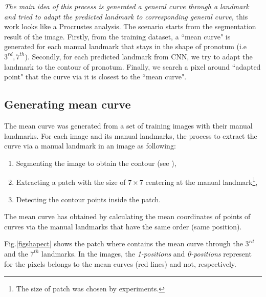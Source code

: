 \documentclass[10pt]{article}
\begin{document}
\textit{The main idea of this process is generated a general curve through a landmark and tried to adapt the predicted landmark to corresponding general curve,} this work looks like a Procrustes analysis. The scenario starts from the segmentation result of the image. Firstly, from the training dataset, a ``mean curve" is generated for each manual landmark that stays in the shape of pronotum (i.e $3^{rd}, 7^{th}$). Secondly, for each predicted landmark from CNN, we try to adapt the landmark to the contour of pronotum. Finally, we search a pixel around ``adapted point" that the curve via it is closest to the ``mean curve".

\subsection{Generating mean curve}
The mean curve was generated from a set of training images with their manual landmarks. For each image and its manual landmarks, the process to extract the curve via a manual landmark in an image as following:
\begin{enumerate}[nosep]
	\item Segmenting the image to obtain the contour (see \cite{le2017maelab}),
	\item Extracting a patch with the size of $7 \times 7$ centering at the manual landmark\footnote{The size of patch was chosen by experiments.},
	\item Detecting the contour points inside the patch.
\end{enumerate}
The mean curve has obtained by calculating the mean coordinates of points of curves via the manual landmarks that have the same order (same position).

Fig.\ref{figshapect} shows the patch where contains the mean curve through the $3^{rd}$ and the $7^{th}$ landmarks. In the images, the \textit{1-positions} and \textit{0-positions} represent for the pixels belongs to the mean curves (red lines) and not, respectively.
\end{document}
